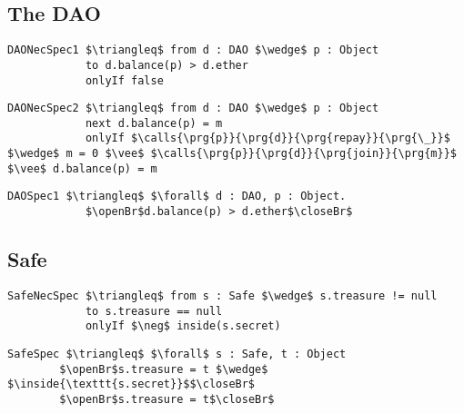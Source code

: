 \subsection{The DAO}
\label{ss:DAO}

\begin{lstlisting}[language = Chainmail, mathescape=true, frame=lines]
DAONecSpec1 $\triangleq$ from d : DAO $\wedge$ p : Object
            to d.balance(p) > d.ether
            onlyIf false
\end{lstlisting}
\begin{lstlisting}[language = Chainmail, mathescape=true, frame=lines]
DAONecSpec2 $\triangleq$ from d : DAO $\wedge$ p : Object
            next d.balance(p) = m
            onlyIf $\calls{\prg{p}}{\prg{d}}{\prg{repay}}{\prg{\_}}$ $\wedge$ m = 0 $\vee$ $\calls{\prg{p}}{\prg{d}}{\prg{join}}{\prg{m}}$ $\vee$ d.balance(p) = m
\end{lstlisting}

\begin{lstlisting}[language = Chainmail, mathescape=true, frame=lines]
DAOSpec1 $\triangleq$ $\forall$ d : DAO, p : Object.
            $\openBr$d.balance(p) > d.ether$\closeBr$
\end{lstlisting}

\subsection{Safe}
\label{ss:Safe}


\begin{lstlisting}[language = Chainmail, mathescape=true, frame=lines]
SafeNecSpec $\triangleq$ from s : Safe $\wedge$ s.treasure != null
            to s.treasure == null
            onlyIf $\neg$ inside(s.secret)
\end{lstlisting}
\begin{lstlisting}[language = Chainmail, mathescape=true, frame=lines]
SafeSpec $\triangleq$ $\forall$ s : Safe, t : Object
		$\openBr$s.treasure = t $\wedge$ $\inside{\texttt{s.secret}}$$\closeBr$
		$\openBr$s.treasure = t$\closeBr$
\end{lstlisting}


